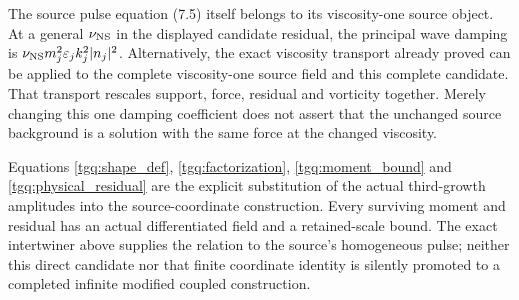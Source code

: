 \documentclass[11pt]{article}
\begin{document}
The source pulse equation (7.5) itself belongs to its viscosity-one
source object. At a general $\nu_{\rm NS}$ in the displayed candidate
residual, the principal wave damping is
$\nu_{\rm NS}m_j^2\varepsilon_jk_j^2|n_j|^2$.
Alternatively, the exact viscosity transport already proved can be
applied to the complete viscosity-one source field and this complete
candidate. That transport rescales support, force, residual and
vorticity together. Merely changing this one damping coefficient
does not assert that the unchanged source background is a solution
with the same force at the changed viscosity.

Equations \eqref{tgq:shape_def}, \eqref{tgq:factorization},
\eqref{tgq:moment_bound} and \eqref{tgq:physical_residual} are the
explicit substitution of the actual third-growth amplitudes into
the source-coordinate construction. Every surviving moment and
residual has an actual differentiated field and a retained-scale
bound. The exact intertwiner above supplies the relation to the
source's homogeneous pulse; neither this direct candidate nor that
finite coordinate identity is silently promoted to a completed
infinite modified coupled construction.
\end{document}
